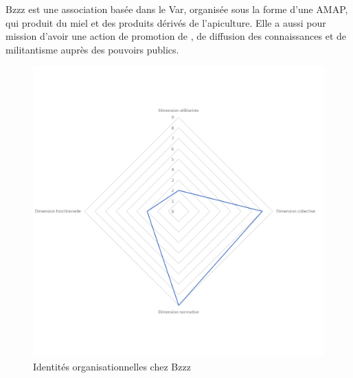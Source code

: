         Bzzz est une association basée dans le Var, organisée sous la forme d’une AMAP, qui produit du miel et des produits dérivés de l’apiculture. Elle a aussi pour mission d’avoir une action de promotion de , de diffusion des connaissances et de militantisme auprès des pouvoirs publics.

        \begin{figure}[h]
            \caption{Identités organisationnelles chez Bzzz}
            \label{figure:dimbzzz}
            \includegraphics[width=\linewidth]{fig/radars/Bzzz.png}
        \end{figure}


